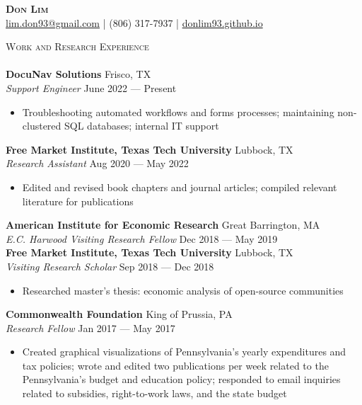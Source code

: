 \documentclass[a4paper,11pt]{article}
\newcommand{\lineunder} {
    \vspace*{-8pt} \\
    \hspace*{-18pt} \hrulefill \\
}
\newcommand{\header} [1] {
    {\hspace*{-18pt}\vspace*{6pt} \textsc{\large{#1}}}
    \vspace*{-6pt} \lineunder
}
\begin{document}
\vspace*{-40pt}

\vspace*{-10pt}
\begin{center}
    {\Huge \scshape \textbf{{Don Lim}}}\\
    \href{mailto:lim.don93@gmail.com}{lim.don93@gmail.com} | (806) 317-7937 | \href{https://donlim93.github.io/}{donlim93.github.io} \\
\end{center}
\header{Work and Research Experience}
\textbf{DocuNav Solutions} \hfill Frisco, TX \\
\textit{Support Engineer} \hfill June 2022 --- Present \\
\begin{itemize}
    \item Troubleshooting automated workflows and forms processes; maintaining non-clustered SQL databases; internal IT support
\end{itemize}    

\textbf{Free Market Institute, Texas Tech University} \hfill Lubbock, TX\\
\textit{Research Assistant} \hfill Aug 2020 --- May 2022 \\
\begin{itemize}
    \item Edited and revised book chapters and journal articles; compiled relevant literature for publications
\end{itemize}

\textbf{American Institute for Economic Research} \hfill Great Barrington, MA\\
\textit{E.C. Harwood Visiting Research Fellow} \hfill Dec 2018 --- May 2019\\

\textbf{Free Market Institute, Texas Tech University} \hfill Lubbock, TX\\
\textit{Visiting Research Scholar} \hfill Sep 2018 --- Dec 2018\\
\begin{itemize}
    \item Researched master's thesis: economic analysis of open-source communities
\end{itemize}

\textbf{Commonwealth Foundation} \hfill King of Prussia, PA\\
\textit{Research Fellow} \hfill Jan 2017 --- May 2017\\
\begin{itemize}
    \item Created graphical visualizations of Pennsylvania's yearly expenditures and tax policies; wrote and edited two publications per week related to the Pennsylvania's budget and education policy; responded to email inquiries related to subsidies, right-to-work laws, and the state budget
\end{itemize}
\end{document}

